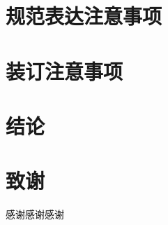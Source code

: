 \documentclass[
	StudentName     = 姓名,
	StudentID       = 学号,
	AdvisorName     = 指导教师,
	Grade           = 年级,
	Major           = 专业,
	Department      = 一个很长很长的名字,
	SubmitYear		= 2022,
	SubmitMonth		= 5,
	Title           = 论文中文题目,
	TitleEng        = {{English Title}}
]{cauc_thesis}
\begin{document}
	{\centering\chapter{规范表达注意事项}}
	{\centering\chapter{装订注意事项}}
	{\centering\chapter{结论}}
	
	{\centering }
	

	
	\thispagestyle{plain}
	
	
	{\centering \chapter *{致\qquad 谢}}
	
	\markboth{}{}
	感谢感谢感谢
\end{document}
